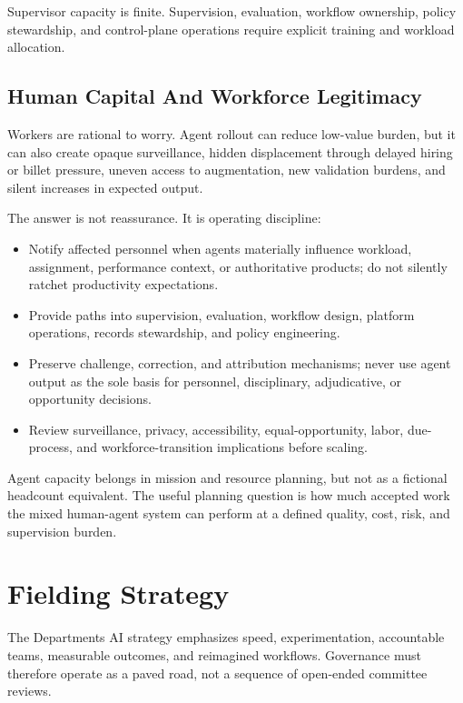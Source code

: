 \documentclass[11pt]{article}
\begin{document}
Supervisor capacity is finite. Supervision, evaluation, workflow
ownership, policy stewardship, and control-plane operations require
explicit training and workload allocation.

\hypertarget{93-human-capital-and-workforce-legitimacy}{%
\subsection{Human Capital And Workforce
Legitimacy}\label{93-human-capital-and-workforce-legitimacy}}

Workers are rational to worry. Agent rollout can reduce low-value
burden, but it can also create opaque surveillance, hidden displacement
through delayed hiring or billet pressure, uneven access to
augmentation, new validation burdens, and silent increases in expected
output.

The answer is not reassurance. It is operating discipline:

\begin{itemize}
\tightlist
\item
  Notify affected personnel when agents materially influence workload,
  assignment, performance context, or authoritative products; do not
  silently ratchet productivity expectations.
\item
  Provide paths into supervision, evaluation, workflow design, platform
  operations, records stewardship, and policy engineering.
\item
  Preserve challenge, correction, and attribution mechanisms; never use
  agent output as the sole basis for personnel, disciplinary,
  adjudicative, or opportunity decisions.
\item
  Review surveillance, privacy, accessibility, equal-opportunity, labor,
  due-process, and workforce-transition implications before scaling.
\end{itemize}

Agent capacity belongs in mission and resource planning, but not as a
fictional headcount equivalent. The useful planning question is how much
accepted work the mixed human-agent system can perform at a defined
quality, cost, risk, and supervision burden.

\hypertarget{10-fielding-strategy}{%
\section{Fielding Strategy}\label{10-fielding-strategy}}

The Department\textquotesingle s AI strategy emphasizes speed,
experimentation, accountable teams, measurable outcomes, and reimagined
workflows. Governance must therefore operate as a paved road, not a
sequence of open-ended committee reviews.
\end{document}
